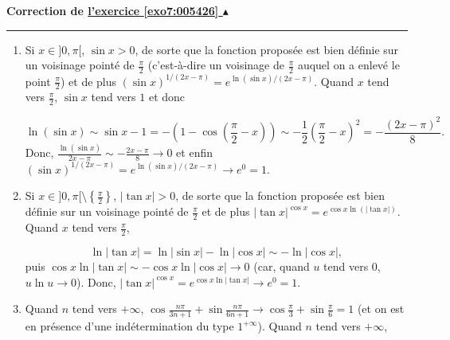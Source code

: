\documentclass[11pt,a4paper]{article}
\newcommand{\noindication}{}
\newcounter{exo}
\newcommand{\correction}[1]{\hypertarget{cor7:#1}{}\label{cor7:#1}{\bf Correction de \hyperlink{exo7:#1}{l'exercice \ref{exo7:#1} $\blacktriangle$}}\vspace{1mm}\hrule\vspace{1mm}}
\newcommand{\finenonces}{\newpage}
\newcommand{\finindications}{\newpage}
\begin{document}
 \finenonces 



 \finindications 

\noindication
\noindication
\noindication
\noindication
\noindication
\noindication
\noindication
\noindication
\noindication
\noindication
\noindication
\noindication
\noindication
\noindication
\noindication
\noindication
\noindication


\newpage

\correction{005426}
\begin{enumerate}
 \item  Si $x\in]0,\pi[$, $\sin x>0$, de sorte que la fonction proposée est bien définie sur un voisinage pointé de $\frac{\pi}{2}$ (c'est-à-dire un voisinage de $\frac{\pi}{2}$ auquel on a enlevé le point $\frac{\pi}{2}$) et de plus $(\sin x)^{1/(2x-\pi)}=e^{\ln(\sin x)/(2x-\pi)}$.
Quand $x$ tend vers $\frac{\pi}{2}$, $\sin x$ tend vers $1$ et donc

$$\ln(\sin x)\sim\sin x-1=-\left(1-\cos\left(\frac{\pi}{2}-x\right)\right)\sim-\frac{1}{2}\left(\frac{\pi}{2}-x\right)^2=-\frac{(2x-\pi)^2}{8}.$$
Donc, $\frac{\ln(\sin x)}{2x-\pi}\sim-\frac{2x-\pi}{8}\rightarrow0$ et enfin $(\sin x)^{1/(2x-\pi)}=e^{\ln(\sin x)/(2x-\pi)}\rightarrow e^0=1$.

\begin{center}
\end{center}
 \item  Si $x\in]0,\pi[\setminus\left\{\frac{\pi}{2}\right\}$, $|\tan x|>0$, de sorte que la fonction proposée est bien définie sur un voisinage pointé de $\frac{\pi}{2}$ et de plus $|\tan x|^{\cos x}=e^{\cos x\ln(|\tan x|)}$. Quand $x$ tend vers $\frac{\pi}{2}$, 

$$\ln|\tan x|=\ln|\sin x|-\ln|\cos x|\sim-\ln|\cos x|,$$
puis $\cos x\ln|\tan x|\sim-\cos x\ln|\cos x|\rightarrow0$ (car, quand $u$ tend vers $0$, $u\ln u\rightarrow 0$).
Donc, $|\tan x|^{\cos x}=e^{\cos x\ln|\tan x|}\rightarrow e^0=1$.

\begin{center}
\end{center}
 \item  Quand $n$ tend vers $+\infty$, $\cos\frac{n\pi}{3n+1}+\sin\frac{n\pi}{6n+1}\rightarrow\cos\frac{\pi}{3}+\sin\frac{\pi}{6}=1$ (et on est en présence d'une indétermination du type $1^{+\infty}$). Quand $n$ tend vers $+\infty$,


\end{enumerate}
\end{document}
